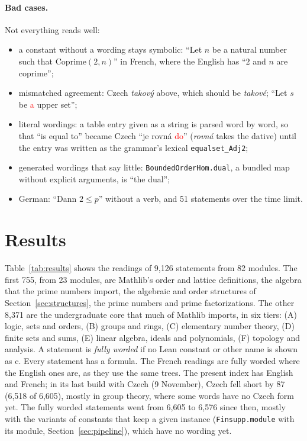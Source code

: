 \documentclass{easychair}
\newcommand{\ttt}[1]{\texttt{#1}}
\begin{document}
\paragraph{Bad cases.} Not everything reads well:
\begin{itemize}
\item a constant without a wording stays symbolic: ``Let $n$ be a natural number such that
  $\mathrm{Coprime}(2, n)$'' in French, where the English has ``$2$ and $n$ are coprime'';
\item mismatched agreement: Czech \emph{takový} above, which should be \emph{takové}; ``Let
  $s$ be \textcolor{red}{a} upper set'';
\item literal wordings: a table entry given as a string is parsed word by word, so that ``is
  equal to'' became Czech ``je rovná \textcolor{red}{do}'' (\emph{rovná} takes the dative) until
  the entry was written as the grammar's lexical \ttt{equalset\_Adj2};
\item generated wordings that say little: \ttt{BoundedOrderHom.dual}, a bundled map without
  explicit arguments, is ``the dual'';
\item German: ``Dann $2 \leq p$'' without a verb, and 51 statements over the time limit.
\end{itemize}

\section{Results}

Table~\ref{tab:results} shows the readings of 9,126 statements from 82 modules. The first 755,
from 23 modules, are Mathlib's order and lattice definitions, the algebra that the prime numbers
import, the algebraic and order structures of Section~\ref{sec:structures}, the prime numbers
and prime factorizations. The other 8,371 are the undergraduate core that much of Mathlib
imports, in six tiers: (A) logic, sets and orders, (B) groups and rings, (C) elementary number
theory, (D) finite sets and sums, (E) linear algebra, ideals and polynomials, (F) topology and
analysis. A statement is \emph{fully worded} if no Lean constant or other name is shown as
$\mathrm{c}$. Every statement has a formula. The French readings are fully worded where the
English ones are, as they use the same trees. The present index has English and French; in its
last build with Czech (9 November), Czech fell short by 87 (6,518 of 6,605), mostly in group
theory, where some words have no Czech form yet. The fully worded statements went from 6,605 to
6,576 since then, mostly with the variants of constants that keep a given instance
(\ttt{Finsupp.module} with its module, Section~\ref{sec:pipeline}), which have no wording yet.
\end{document}
